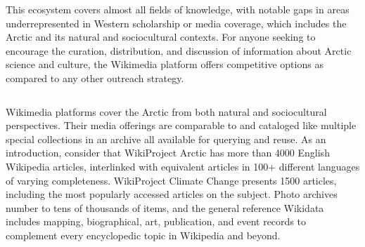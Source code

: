 \documentclass[25pt, a0paper, portrait]{tikzposter}
\begin{document}
\begin{columns}
{    This ecosystem covers almost all fields of knowledge, with notable gaps in areas underrepresented in Western scholarship or media coverage, which includes the Arctic and its natural and sociocultural contexts. For anyone seeking to encourage the curation, distribution, and discussion of information about Arctic science and culture, the Wikimedia platform offers competitive options as compared to any other outreach strategy.

}

\end{columns}


{    
    Wikimedia platforms cover the Arctic from both natural and sociocultural perspectives. Their media offerings are comparable to and cataloged like multiple special collections in an archive all available for querying and reuse. As an introduction, consider that WikiProject Arctic has more than 4000 English Wikipedia articles, interlinked with equivalent articles in 100+ different languages of varying completeness. WikiProject Climate Change presents 1500 articles, including the most popularly accessed articles on the subject. Photo archives number to tens of thousands of items, and the general reference Wikidata includes mapping, biographical, art, publication, and event records to complement every encyclopedic topic in Wikipedia and beyond.

}
\end{document}
